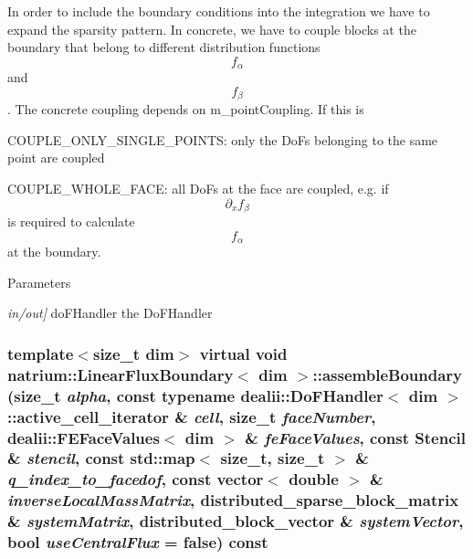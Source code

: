 In order to include the boundary conditions into the integration we have to expand the sparsity pattern. In concrete, we have to couple blocks at the boundary that belong to different distribution functions \[ f_{\alpha} \] and \[ f_{\beta} \]. The concrete coupling depends on m\_\-pointCoupling. If this is
\begin{DoxyItemize}
\item COUPLE\_\-ONLY\_\-SINGLE\_\-POINTS: only the DoFs belonging to the same point are coupled
\item COUPLE\_\-WHOLE\_\-FACE: all DoFs at the face are coupled, e.g. if \[ \partial_{x}f_{\beta} \] is required to calculate \[ f_{\alpha} \] at the boundary. 
\end{DoxyItemize}
\begin{DoxyParams}{Parameters}
\item[{\em in/out\mbox{]}}]doFHandler the DoFHandler \end{DoxyParams}
\hypertarget{classnatrium_1_1LinearFluxBoundary_a0b050ff4bc9204ae732fec318c21cf2b}{
\subsubsection[{assembleBoundary}]{\setlength{\rightskip}{0pt plus 5cm}template$<$size\_\-t dim$>$ virtual void {\bf natrium::LinearFluxBoundary}$<$ dim $>$::assembleBoundary (size\_\-t {\em alpha}, \/  const typename dealii::DoFHandler$<$ dim $>$::active\_\-cell\_\-iterator \& {\em cell}, \/  size\_\-t {\em faceNumber}, \/  dealii::FEFaceValues$<$ dim $>$ \& {\em feFaceValues}, \/  const {\bf Stencil} \& {\em stencil}, \/  const std::map$<$ size\_\-t, size\_\-t $>$ \& {\em q\_\-index\_\-to\_\-facedof}, \/  const vector$<$ double $>$ \& {\em inverseLocalMassMatrix}, \/  distributed\_\-sparse\_\-block\_\-matrix \& {\em systemMatrix}, \/  distributed\_\-block\_\-vector \& {\em systemVector}, \/  bool {\em useCentralFlux} = {\ttfamily false}) const}}
\label{classnatrium_1_1LinearFluxBoundary_a0b050ff4bc9204ae732fec318c21cf2b}


